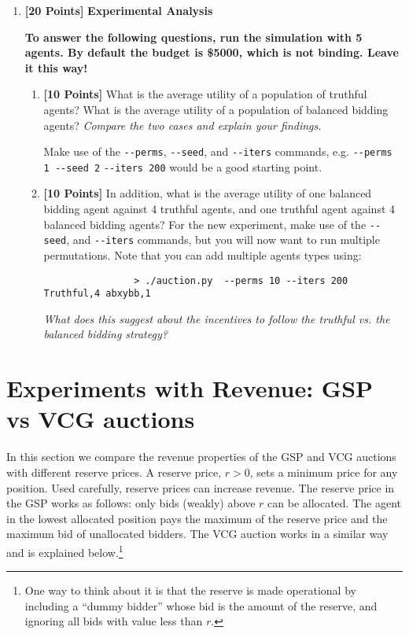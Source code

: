 \documentclass[11pt]{article}
\newcommand{\points}[1]{\textbf{[#1 Points]}}
\begin{document}
\begin{enumerate}
		\item \points{20} {\bf Experimental Analysis}

{\bf 			To answer the following questions, run the
			simulation with 5 agents. By default the
			budget is \$5000, which is 
not binding. Leave it
			this way!}
		
			\begin{enumerate}			
				\item \points{10} What is the average utility of a population of truthful agents? What is the average utility of a population of balanced bidding agents? {\em  Compare the two cases and explain your findings.}


				Make use of the \verb+--perms+, \verb+--seed+, and \verb+--iters+ commands, e.g. \verb+--perms 1 --seed 2+ \verb+--iters 200+ would be a good starting point.

				\item \points{10} In addition, what is the
average utility of one balanced bidding agent against 4 truthful agents, and
one truthful agent against 4 balanced bidding agents?
For the new experiment,
make use of the \verb+--seed+, and \verb+--iters+ commands, but you will now
want to run multiple permutations. Note that you can add multiple agents types using:
			\begin{verbatim}
				> ./auction.py  --perms 10 --iters 200 Truthful,4 abxybb,1
			\end{verbatim}
%

{\em What does this suggest about the incentives to follow the truthful vs. the balanced bidding strategy?}

			\end{enumerate}

\end{enumerate}

\section{Experiments with Revenue: GSP vs VCG auctions}

In this section we compare the revenue properties of the GSP and VCG
auctions with different reserve prices.
%
A reserve price, $r>0$, sets a minimum price for any position.  Used
carefully, reserve prices can increase revenue.  
%
The reserve price in the GSP works as follows: only bids (weakly)
above $r$ can be allocated.  The agent in the lowest allocated
position pays the maximum of the reserve price and the maximum bid of
unallocated bidders. The VCG auction works in a similar way and is
explained below.\footnote{One way to think about it is that the
  reserve is made operational by including a ``dummy bidder'' whose
  bid is the amount of the reserve, and ignoring all bids with value
  less than $r$.}
\end{document}
